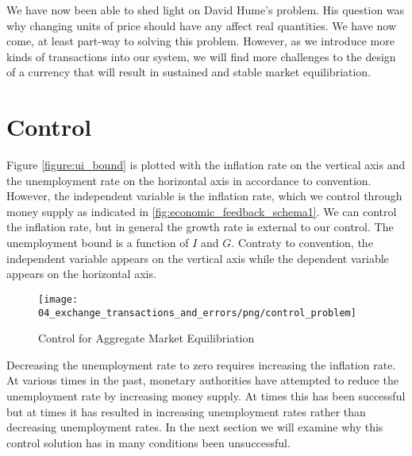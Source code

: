 We have now been able to shed light on David Hume's problem. His question was why changing units of
price should have any affect real quantities. We have now come, at least part-way to solving this
problem. However, as we introduce more kinds of transactions into our system, we will find more
challenges to the design of a currency that will result in sustained and stable market
equilibriation.  

\section{Control}

Figure \ref{figure:ui_bound} is plotted with the inflation rate on the vertical axis and the
unemployment rate on the horizontal axis in accordance to convention. However, the independent
variable is the inflation rate, which we control through money supply as indicated in
\ref{fig:economic_feedback_schema1}. We can control the inflation rate, but in general the growth
rate is external to our control. The unemployment bound is a function of $I$ and $G$. Contraty to
convention, the independent variable appears on the vertical axis while the dependent variable
appears on the horizontal axis. 

\begin{figure}[H]
\centering
\texttt{[image: 04\_exchange\_transactions\_and\_errors/png/control\_problem]}
\caption{Control for Aggregate Market Equilibriation}
\label{fig:control_problem}
\end{figure}

Decreasing the unemployment rate to zero requires increasing the inflation rate. At various times in
the past, monetary authorities have attempted to reduce the unemployment rate by increasing money
supply. At times this has been successful but at times it has resulted in increasing unemployment
rates rather than decreasing unemployment rates. In the next section we will examine why this
control solution has in many conditions been unsuccessful.
